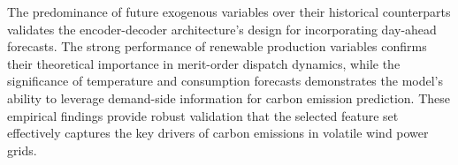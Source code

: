 The predominance of future exogenous variables over their historical counterparts validates the encoder-decoder architecture's design for incorporating day-ahead forecasts. The strong performance of renewable production variables confirms their theoretical importance in merit-order dispatch dynamics, while the significance of temperature and consumption forecasts demonstrates the model's ability to leverage demand-side information for carbon emission prediction. These empirical findings provide robust validation that the selected feature set effectively captures the key drivers of carbon emissions in volatile wind power grids.
